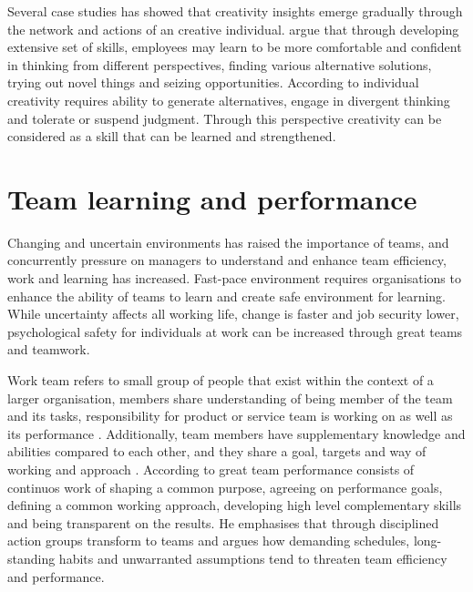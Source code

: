 Several case studies has showed that creativity insights emerge gradually through the network and actions of an creative individual. \citet{shalley2004leaders} argue that through developing extensive set of skills, employees may learn to be more comfortable and confident in thinking from different perspectives, finding various alternative solutions, trying out novel things and seizing opportunities. According to \citet{hennessey19881} individual creativity requires ability to generate alternatives, engage in divergent thinking and tolerate or suspend judgment. Through this perspective creativity can be considered as a skill that can be learned and strengthened. 

\section{Team learning and performance}
Changing and uncertain environments has raised the importance of teams, and concurrently pressure on managers to understand and enhance team efficiency, work and learning has increased. Fast-pace environment requires organisations to enhance the ability of teams to learn and create safe environment for learning. While uncertainty affects all working life, change is faster and job security lower, psychological safety for individuals at work can be increased through great teams and teamwork. \citep{edmondson1999psychological}

Work team refers to small group of people that exist within the context of a larger organisation, members share understanding of being member of the team and its tasks, responsibility for product or service team is working on \citep{hackman1987design,alderfer1983intergroup} as well as its performance \citep{edmondson1999psychological}. Additionally, team members have supplementary knowledge and abilities compared to each other, and they share a goal, targets and way of working and approach \citep{edmondson1999psychological}. According to \citet{katzenbach1993wisdom} great team performance consists of continuos work of shaping a common purpose, agreeing on performance goals, defining a common working approach, developing high level complementary skills and being transparent on the results. He emphasises that through disciplined action groups transform to teams and argues how demanding schedules, long-standing habits and unwarranted assumptions tend to threaten team efficiency and performance.

